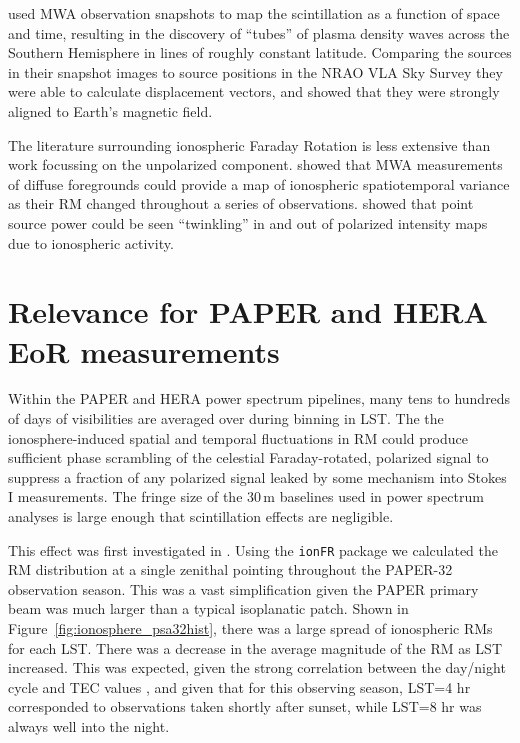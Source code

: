 \cite{Loi.15} used MWA observation snapshots to map the scintillation as a function of space and time, resulting in the discovery of ``tubes'' of plasma density waves across the Southern Hemisphere in lines of roughly constant latitude. Comparing the sources in their snapshot images to source positions in the NRAO VLA Sky Survey \citep[NVSS][]{Condon.98} they were able to calculate displacement vectors, and showed that they were strongly aligned to Earth's magnetic field.

The literature surrounding ionospheric Faraday Rotation is less extensive than work focussing on the unpolarized component. \cite{Lenc.16} showed that MWA measurements of diffuse foregrounds could provide a map of ionospheric spatiotemporal variance as their RM changed throughout a series of observations. \cite{Lenc.17} showed that point source power could be seen ``twinkling'' in and out of polarized intensity maps due to ionospheric activity.

\section{Relevance for PAPER and HERA EoR measurements}
\label{sec:widefieldRMionosphere}

Within the PAPER and HERA power spectrum pipelines, many tens to hundreds of days of visibilities are averaged over during binning in LST. The the ionosphere-induced spatial and temporal fluctuations in RM could produce sufficient phase scrambling of the celestial Faraday-rotated, polarized signal to suppress a fraction of any polarized signal leaked by some mechanism into Stokes I measurements. The fringe size of the 30\,m baselines used in power spectrum analyses is large enough that scintillation effects are negligible.

This effect was first investigated in \cite{Moore.17}. Using the {\tt ionFR} package \citep{Sotomayor-Beltran.13} we calculated the RM distribution at a single zenithal pointing throughout the PAPER-32 observation season. This was a vast simplification given the PAPER primary beam was much larger than a typical isoplanatic patch. Shown in Figure~\ref{fig:ionosphere_psa32hist}, there was a large spread of ionospheric RMs for each LST. There was a decrease in the average magnitude of the RM as LST increased. This was expected, given the strong correlation between the day/night cycle and TEC values \citep[e.g.][]{Tariku.15}, and given that for this observing season, LST=4 hr corresponded to observations taken shortly after sunset, while LST=8 hr was always well into the night.

